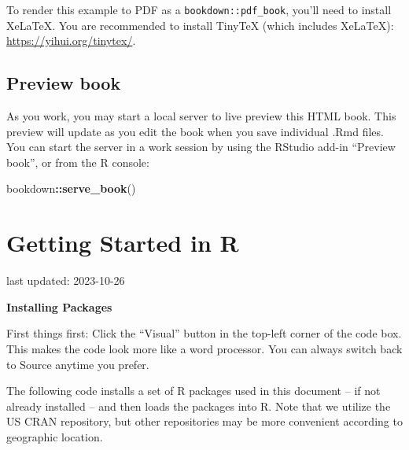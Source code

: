\documentclass[
]{book}
\newenvironment{Shaded}{\begin{snugshade}}{\end{snugshade}}
\newcommand{\FunctionTok}[1]{\textcolor[rgb]{0.13,0.29,0.53}{\textbf{#1}}}
\newcommand{\NormalTok}[1]{#1}
\newcommand{\SpecialCharTok}[1]{\textcolor[rgb]{0.81,0.36,0.00}{\textbf{#1}}}
\begin{document}
To render this example to PDF as a \texttt{bookdown::pdf\_book}, you'll need to install XeLaTeX. You are recommended to install TinyTeX (which includes XeLaTeX): \url{https://yihui.org/tinytex/}.

\hypertarget{preview-book}{%
\section{Preview book}\label{preview-book}}

As you work, you may start a local server to live preview this HTML book. This preview will update as you edit the book when you save individual .Rmd files. You can start the server in a work session by using the RStudio add-in ``Preview book'', or from the R console:

\begin{Shaded}
\begin{Highlighting}[]
\NormalTok{bookdown}\SpecialCharTok{::}\FunctionTok{serve\_book}\NormalTok{()}
\end{Highlighting}
\end{Shaded}

\hypertarget{getting-started-in-r}{%
\chapter{Getting Started in R}\label{getting-started-in-r}}

last updated: 2023-10-26

\textbf{Installing Packages}

First things first: Click the ``Visual'' button in the top-left corner of the code box. This makes the code look more like a word processor. You can always switch back to Source anytime you prefer.

The following code installs a set of R packages used in this document -- if not already installed -- and then loads the packages into R. Note that we utilize the US CRAN repository, but other repositories may be more convenient according to geographic location.
\end{document}
